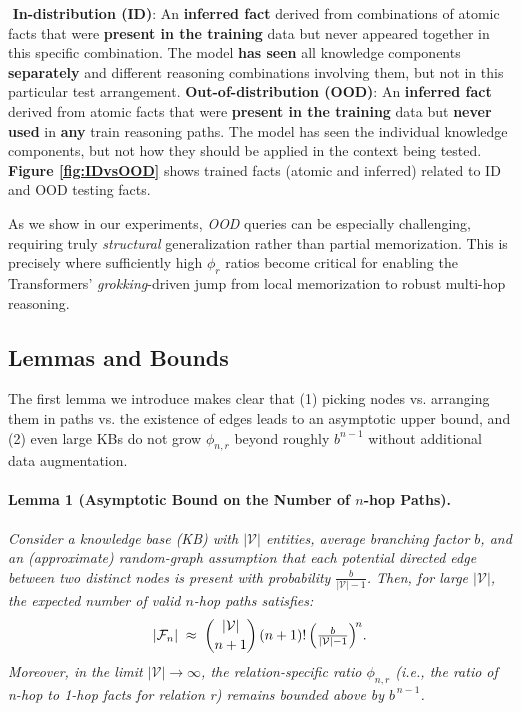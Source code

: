         \begin{definition} $ $
            \label{def:id_ood}
            \newline\textbf{In-distribution (ID)}: An \textbf{inferred fact} derived from combinations of atomic facts that were \textbf{present in the training} data but never appeared together in this specific combination. The model \textbf{has seen} all knowledge components \textbf{separately} and different reasoning combinations involving them, but not in this particular test arrangement. 
            \newline\textbf{Out-of-distribution (OOD)}: An \textbf{inferred fact} derived from atomic facts that were \textbf{present in the training} data but \textbf{never used} in \textbf{any} train reasoning paths. The model has seen the individual knowledge components, but not how they should be applied in the context being tested.
            \newline\textbf{Figure \ref{fig:IDvsOOD}} shows trained facts (atomic and inferred) related to ID and OOD testing facts. 
        \end{definition}
        
        As we show in our experiments, \emph{OOD} queries can be especially challenging, requiring truly \emph{structural} generalization rather than partial memorization. This is precisely where sufficiently high \(\phi_r\) ratios become critical for enabling the Transformers’ \emph{grokking}-driven jump from local memorization to robust multi-hop reasoning.
        
    \subsection{Lemmas and Bounds}
        The first lemma we introduce makes clear that (1) picking nodes vs. arranging them in paths vs. the existence of edges leads to an asymptotic upper bound, and (2) even large KBs do not grow $\phi_{n,r}$ beyond roughly $b^{n-1}$ without additional data augmentation.

        \paragraph{Lemma 1 (Asymptotic Bound on the Number of $n$-hop Paths).}
            \label{lem:asymptoticF_n}
            \emph{Consider a knowledge base (KB) with $|\mathcal{V}|$ entities, average branching factor $b$, and an (approximate) random-graph assumption that each potential \emph{directed} edge between two distinct nodes is present with probability $\tfrac{b}{|\mathcal{V}|-1}$. Then, for large $|\mathcal{V}|$, the expected number of valid $n$-hop paths satisfies:}
            \[
            |\mathcal{F}_n| \;\approx\; \binom{|\mathcal{V}|}{n+1}\,(n+1)!\,
            \Bigl(\tfrac{b}{|\mathcal{V}|-1}\Bigr)^{\!n}.
            \]
            \emph{Moreover, in the limit $|\mathcal{V}|\to\infty$, the relation-specific ratio $\phi_{n,r}$ (i.e., the ratio of n-hop to 1-hop facts for relation r) remains bounded above by $b^{\,n-1}$.}
        
